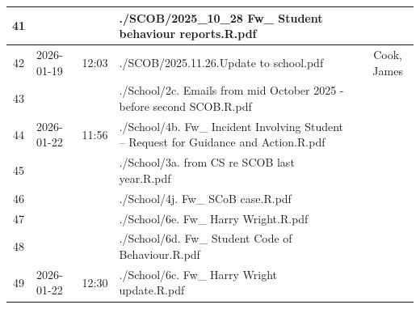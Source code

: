 \begin{landscape}
\begin{tabularx}{\linewidth}{|c|l|l|X|c|c|}
		41                               &                     &                & ./SCOB/2025\_10\_28 Fw\_ Student behaviour reports.R.pdf                                                               &                         &                          \\ \hline
		42                               & 2026-01-19          & 12:03          & ./SCOB/2025.11.26.Update to school.pdf                                                                                 &                         & Cook, James              \\ \hline
		43                               &                     &                & ./School/2c. Emails from mid October 2025 - before second SCOB.R.pdf                                                   &                         &                          \\ \hline
		44                               & 2026-01-22          & 11:56          & ./School/4b. Fw\_ Incident Involving Student – Request for Guidance and Action.R.pdf                                   &                         &                          \\ \hline
		45                               &                     &                & ./School/3a. from CS re SCOB last year.R.pdf                                                                           &                         &                          \\ \hline
		46                               &                     &                & ./School/4j. Fw\_ SCoB case.R.pdf                                                                                      &                         &                          \\ \hline
		47                               &                     &                & ./School/6e. Fw\_ Harry Wright.R.pdf                                                                                   &                         &                          \\ \hline
		48                               &                     &                & ./School/6d. Fw\_ Student Code of Behaviour.R.pdf                                                                      &                         &                          \\ \hline
		49                               & 2026-01-22          & 12:30          & ./School/6c. Fw\_ Harry Wright update.R.pdf                                                                            &                         &                          \\ \hline

\end{tabularx}
\end{landscape}
